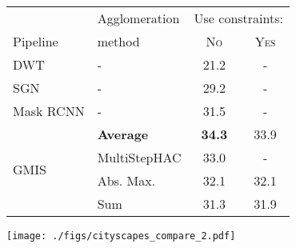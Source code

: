 \begin{figure}[t]
\centering
\begin{minipage}[T]{0.6\textwidth}
    \centering
    \scriptsize
        \begin{tabular}{l|l|cc}
           & Agglomeration  &  \multicolumn{2}{c}{Use constraints:} \\
          Pipeline & method & \textsc{No} & \textsc{Yes} \\ \midrule
DWT \cite{bai2017deep} & - & 21.2 & - \\
SGN \cite{liu2017sgn} & - & 29.2 & - \\
Mask RCNN \cite{he2017mask} & - & 31.5 & - \\ \hline
 & \textbf{\algname{} Average}& \textbf{34.3}  & 33.9  \\
\multirow{2}{*}{GMIS \cite{liu2018affinity}} & MultiStepHAC \cite{liu2018affinity} & 33.0 & -  \\
 & \algname{} Abs. Max. \cite{wolf2018mutex}  & 32.1 & 32.1 \\
 & \algname{} Sum \cite{keuper2015efficient,levinkov2017comparative} & 31.3  & 31.9  \\
        \end{tabular}
    \label{tab:results_cityscapes_val}
\end{minipage}\hfill
\begin{minipage}[T]{0.37\textwidth}
    \centering
\texttt{[image: ./figs/cityscapes\_compare\_2.pdf]} %
\end{minipage}
\end{figure}

